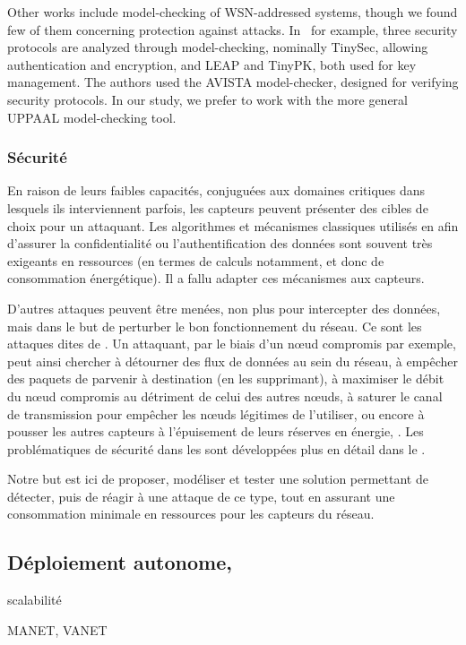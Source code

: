 Other works include model-checking of WSN-addressed systems, though we found few of them concerning protection against \DoS attacks.
In~\cite{TCCDC09} for example, three security protocols are analyzed through model-checking, nominally TinySec, allowing authentication and encryption, and LEAP and TinyPK, both used for key management. 
The authors used the AVISTA model-checker, designed for verifying security protocols.
In our study, we prefer to work with the more general UPPAAL model-checking tool.



        \subsubsection{Sécurité}
En raison de leurs faibles capacités, conjuguées aux domaines critiques dans lesquels ils interviennent parfois, les capteurs peuvent présenter des cibles de choix pour un attaquant.
Les algorithmes et mécanismes classiques utilisés en  afin d'assurer la confidentialité ou l'authentification des données sont souvent très exigeants en ressources (en termes de calculs notamment, et donc de consommation énergétique).
Il a fallu adapter ces mécanismes aux capteurs.

D'autres attaques peuvent être menées, non plus pour intercepter des données, mais dans le but de perturber le bon fonctionnement du réseau.
Ce sont les attaques dites de \textit{\dds}.
Un attaquant, par le biais d'un nœud compromis par exemple, peut ainsi chercher à détourner des flux de données au sein du réseau, à empêcher des paquets de parvenir à destination (en les supprimant), à maximiser le débit du nœud compromis au détriment de celui des autres nœuds, à saturer le canal de transmission pour empêcher les nœuds légitimes de l'utiliser, ou encore à pousser les autres capteurs à l'épuisement de leurs réserves en énergie, \etc.
Les problématiques de sécurité dans les \rcs sont développées plus en détail dans le .

Notre but est ici de proposer, modéliser et tester une solution permettant de détecter, puis de réagir à une attaque de ce type, tout en assurant une consommation minimale en ressources pour les capteurs du réseau.

        \subsection{Déploiement autonome, }
    scalabilité

    MANET, VANET

